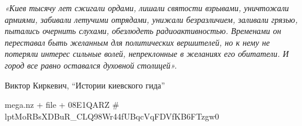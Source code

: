  
 
 
 
 

\begin{center}
\Large\em\color{blue}
«Киев тысячу лет сжигали ордами, лишали святости взрывами, уничтожали армиями,
забивали летучими отрядами, унижали безразличием, заливали грязью, пытались
очернить слухами, обезлюдеть радиоактивностью. Временами он переставал быть
желанным для политических вершителей, но к нему не потеряли интерес сильные
волей, непреклонные в желаниях его обитатели. И город все равно оставался
духовной столицей».

Виктор Киркевич, \enquote{Истории киевского гида}
\end{center}

mega.nz + file + 08E1QARZ # lptMoRBsXDBuR_CLQ98Wr44fUBqcVqFDVfKB6FTzgw0
